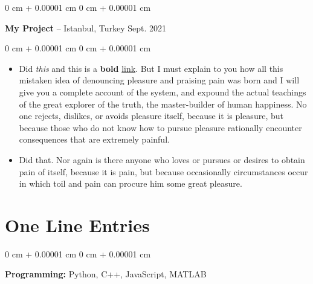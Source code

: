\documentclass[10pt, letterpaper]{article}
\newenvironment{highlights}{
    \begin{itemize}[
        topsep=0.10 cm,
        parsep=0.10 cm,
        partopsep=0pt,
        itemsep=0pt,
        leftmargin=0 cm + 10pt
    ]
}{
    \end{itemize}
} %
\newenvironment{onecolentry}{
    \begin{adjustwidth}{
        0 cm + 0.00001 cm
    }{
        0 cm + 0.00001 cm
    }
}{
    \end{adjustwidth}
} %
\newenvironment{twocolentry}[2][]{
    \onecolentry
    \def\secondColumn{#2}
    \setcolumnwidth{\fill, 4.5 cm}
    \begin{paracol}{2}
}{
    \switchcolumn \raggedleft \secondColumn
    \end{paracol}
    \endonecolentry
} %
\begin{document}
        \vspace{0.2 cm}

        \begin{twocolentry}{
            Sept. 2021
        }
            \textbf{My Project} -- Istanbul, Turkey\end{twocolentry}

        \vspace{0.10 cm}
        \begin{onecolentry}
            \begin{highlights}
                \item Did \textit{this} and this is a \textbf{bold} \href{https://example.com}{link}. But I must explain to you how all this mistaken idea of denouncing pleasure and praising pain was born and I will give you a complete account of the system, and expound the actual teachings of the great explorer of the truth, the master-builder of human happiness. No one rejects, dislikes, or avoids pleasure itself, because it is pleasure, but because those who do not know how to pursue pleasure rationally encounter consequences that are extremely painful.
                \item Did that. Nor again is there anyone who loves or pursues or desires to obtain pain of itself, because it is pain, but because occasionally circumstances occur in which toil and pain can procure him some great pleasure.
            \end{highlights}
        \end{onecolentry}



    
    \section{One Line Entries}

        
        \begin{onecolentry}
            \textbf{Pro\textnormal{gram}ming:} Python, C++, JavaScript, MATLAB
        \end{onecolentry}


    
\end{document}
